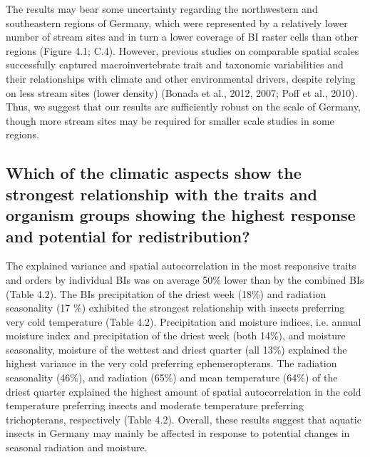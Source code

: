 The results may bear some uncertainty regarding the northwestern and southeastern regions of Germany, which were represented by a relatively lower number of stream sites and in turn a lower coverage of BI raster cells than other regions (Figure 4.1; C.4). However,  previous studies on comparable spatial scales successfully captured macroinvertebrate trait and taxonomic variabilities and their relationships with climate and other environmental drivers, despite relying on less stream sites (lower density) (Bonada et al., 2012, 2007; Poff et al., 2010). Thus, we suggest that our results are sufficiently robust on the scale of Germany, though more stream sites may be required for smaller scale studies in some regions.

\subsection{Which of the climatic aspects show the strongest relationship with the traits and organism groups showing the highest response and potential for redistribution?}
\label{Which of the climatic aspects show the strongest relationship with the traits and organism groups showing the highest response and potential for redistribution?}

The explained variance and spatial autocorrelation in the most responsive traits and orders by individual BIs was on average 50\% lower than by the combined BIs (Table 4.2). The BIs precipitation of the driest week (18\%) and radiation seasonality (17 \%) exhibited the strongest relationship with insects preferring very cold temperature (Table 4.2). Precipitation and moisture indices, i.e. annual moisture index and precipitation of the driest week (both 14\%), and moisture seasonality, moisture of the wettest and driest quarter (all 13\%) explained the highest variance in the very cold preferring ephemeropterans. The radiation seasonality (46\%), and radiation (65\%) and mean temperature (64\%) of the driest quarter explained the highest amount of spatial autocorrelation in the cold temperature preferring insects and moderate temperature preferring trichopterans, respectively (Table 4.2). Overall, these results suggest that aquatic insects in Germany may mainly be affected in response to potential changes in seasonal radiation and moisture.

